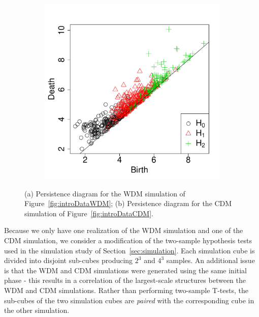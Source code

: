 \documentclass[12pt]{article}
\begin{document}
\begin{figure}[htp!]
\begin{subfigure}{0.45\textwidth}
    \includegraphics[width=\linewidth]{figure_11_cdm_pd.pdf}
    \label{fig:eagleDiagsC}
  \end{subfigure}
  \caption{(a) Persistence diagram for the WDM simulation of Figure~\ref{fig:introDataWDM}; (b) Persistence diagram for the CDM simulation of Figure~\ref{fig:introDataCDM}.}
  \label{fig:eagleDiags}
\end{figure}


Because we only have one realization of the WDM simulation and one of the CDM simulation, we consider a modification of the two-sample hypothesis tests used in the simulation study of Section~\ref{sec:simulation}.   
Each simulation cube is divided into disjoint sub-cubes producing $2^3$ and $4^3$ samples.
%
An additional issue is that the WDM and CDM simulations were generated using the same initial phase - this results in a correlation of the largest-scale structures between the WDM and CDM simulations.  Rather than performing two-sample T-tests, the sub-cubes of the two simulation cubes are \emph{paired} with the corresponding cube in the other simulation.
\end{document}
